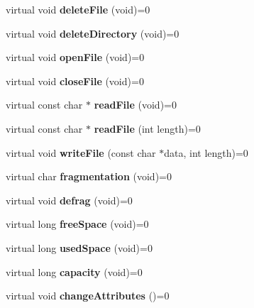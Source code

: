 \begin{DoxyCompactItemize}
\item 
\mbox{\label{class_i_file_system_a99530dfec1763b4bdbf59a335b0d258f}} 
virtual void {\bfseries delete\+File} (void)=0
\item 
\mbox{\label{class_i_file_system_adcbe556f382d2657e995965b14e1008e}} 
virtual void {\bfseries delete\+Directory} (void)=0
\item 
\mbox{\label{class_i_file_system_a214bf58e3df9bdceb55e183f61ced8a8}} 
virtual void {\bfseries open\+File} (void)=0
\item 
\mbox{\label{class_i_file_system_a8c84708a739e7b96d47f44819f6ec064}} 
virtual void {\bfseries close\+File} (void)=0
\item 
\mbox{\label{class_i_file_system_a0ac481f672945e109ba8c41412c4ea24}} 
virtual const char $\ast$ {\bfseries read\+File} (void)=0
\item 
\mbox{\label{class_i_file_system_a3182b47ffd37547ce3175082772a1b53}} 
virtual const char $\ast$ {\bfseries read\+File} (int length)=0
\item 
\mbox{\label{class_i_file_system_a64d6fb96a9c1e7cd3f0c45358f84ad78}} 
virtual void {\bfseries write\+File} (const char $\ast$data, int length)=0
\item 
\mbox{\label{class_i_file_system_a3b9e67a92d0c18163a7b82ff1b7575b5}} 
virtual char {\bfseries fragmentation} (void)=0
\item 
\mbox{\label{class_i_file_system_a33484c8444af9bdda6ecac2cb1a2f069}} 
virtual void {\bfseries defrag} (void)=0
\item 
\mbox{\label{class_i_file_system_a6c78f4f5543658247aec33822d362f81}} 
virtual long {\bfseries free\+Space} (void)=0
\item 
\mbox{\label{class_i_file_system_a28efe29ae21bf46350aa93145cc0e200}} 
virtual long {\bfseries used\+Space} (void)=0
\item 
\mbox{\label{class_i_file_system_a70192875a200cef5c2c7752ef2aca147}} 
virtual long {\bfseries capacity} (void)=0
\item 
\mbox{\label{class_i_file_system_a53681c492975559e268965a4c8fbc17f}} 
virtual void {\bfseries change\+Attributes} ()=0
\end{DoxyCompactItemize}

